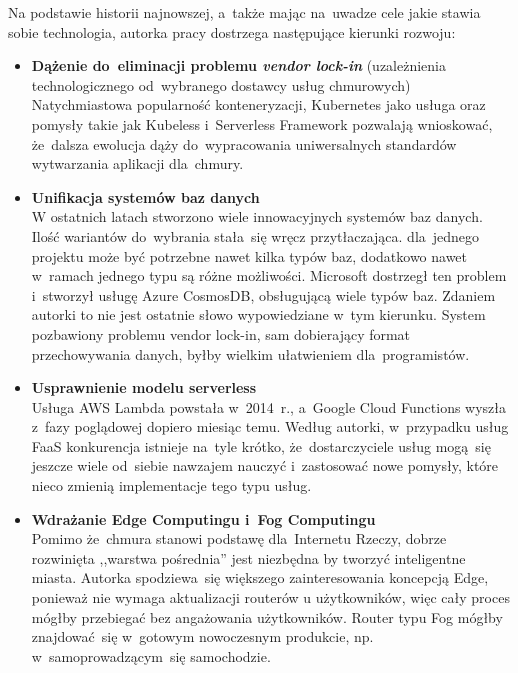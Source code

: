 \documentclass[12pt,a4paper,twoside,titlepage,openright]{book}
\begin{document}
Na podstawie historii najnowszej, a~także mając na~uwadze cele jakie stawia sobie technologia, autorka pracy dostrzega następujące kierunki rozwoju:
\begin{itemize}
\item \textbf{Dążenie do~eliminacji problemu \textit{vendor lock-in}} (uzależnienia technologicznego od~wybranego dostawcy usług chmurowych) \\
Natychmiastowa popularność konteneryzacji, Kubernetes jako usługa oraz pomysły takie jak Kubeless i~Serverless Framework pozwalają wnioskować, że~dalsza ewolucja dąży do~wypracowania uniwersalnych standardów wytwarzania aplikacji dla~chmury.

\item \textbf{Unifikacja systemów baz danych} \\
W ostatnich latach stworzono wiele innowacyjnych systemów baz danych. Ilość wariantów do~wybrania stała~się wręcz przytłaczająca. dla~jednego projektu może być potrzebne nawet kilka typów baz, dodatkowo nawet w~ramach jednego typu są różne możliwości. Microsoft dostrzegł ten problem i~stworzył usługę Azure CosmosDB, obsługującą wiele typów baz. Zdaniem autorki to nie jest ostatnie słowo wypowiedziane w~tym kierunku. System pozbawiony problemu vendor lock-in, sam dobierający format przechowywania danych, byłby wielkim ułatwieniem dla~programistów.

\item \textbf{Usprawnienie modelu serverless} \\
Usługa AWS Lambda powstała w~2014~r., a~Google Cloud Functions wyszła z~fazy poglądowej dopiero miesiąc temu. Według autorki, w~przypadku usług FaaS konkurencja istnieje na~tyle krótko, że~dostarczyciele usług mogą~się jeszcze wiele od~siebie nawzajem nauczyć i~zastosować nowe pomysły, które nieco zmienią implementacje tego typu usług. 

\item \textbf{Wdrażanie Edge Computingu i~Fog Computingu} \\
Pomimo że~chmura stanowi podstawę dla~Internetu Rzeczy, dobrze rozwinięta ,,warstwa pośrednia'' jest niezbędna by tworzyć inteligentne miasta. Autorka spodziewa~się większego zainteresowania koncepcją Edge, ponieważ nie wymaga aktualizacji routerów u użytkowników, więc cały proces mógłby przebiegać bez angażowania użytkowników. Router typu Fog mógłby znajdować~się w~gotowym nowoczesnym produkcie, np. w~samoprowadzącym~się samochodzie. 


\end{itemize}
\end{document}
